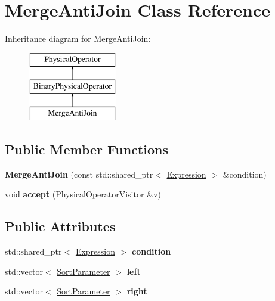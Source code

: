 \hypertarget{class_merge_anti_join}{\section{Merge\+Anti\+Join Class Reference}
\label{class_merge_anti_join}
}
Inheritance diagram for Merge\+Anti\+Join\+:\begin{figure}[H]
\begin{center}
\leavevmode
\includegraphics[height=3.000000cm]{class_merge_anti_join}
\end{center}
\end{figure}
\subsection*{Public Member Functions}
\begin{DoxyCompactItemize}
\item 
\hypertarget{class_merge_anti_join_a314a1c84c2b6c6848f5f4664c2b13c77}{{\bfseries Merge\+Anti\+Join} (const std\+::shared\+\_\+ptr$<$ \hyperlink{class_expression}{Expression} $>$ \&condition)}\label{class_merge_anti_join_a314a1c84c2b6c6848f5f4664c2b13c77}

\item 
\hypertarget{class_merge_anti_join_a15758e7f808703b243101faa382a0156}{void {\bfseries accept} (\hyperlink{class_physical_operator_visitor}{Physical\+Operator\+Visitor} \&v)}\label{class_merge_anti_join_a15758e7f808703b243101faa382a0156}

\end{DoxyCompactItemize}
\subsection*{Public Attributes}
\begin{DoxyCompactItemize}
\item 
\hypertarget{class_merge_anti_join_ae616cc88814ffd21b31ed48693ac60a6}{std\+::shared\+\_\+ptr$<$ \hyperlink{class_expression}{Expression} $>$ {\bfseries condition}}\label{class_merge_anti_join_ae616cc88814ffd21b31ed48693ac60a6}

\item 
\hypertarget{class_merge_anti_join_a1dedfa039b1172db367fc7d3cd0304fc}{std\+::vector$<$ \hyperlink{class_sort_parameter}{Sort\+Parameter} $>$ {\bfseries left}}\label{class_merge_anti_join_a1dedfa039b1172db367fc7d3cd0304fc}

\item 
\hypertarget{class_merge_anti_join_a28f20cf708052a9357799187831c8a33}{std\+::vector$<$ \hyperlink{class_sort_parameter}{Sort\+Parameter} $>$ {\bfseries right}}\label{class_merge_anti_join_a28f20cf708052a9357799187831c8a33}

\end{DoxyCompactItemize}


